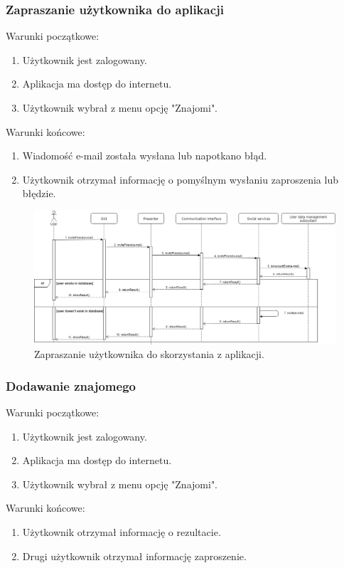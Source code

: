 \documentclass[10pt,twoside,a4paper]{report}
\begin{document}
\subsubsection{Zapraszanie użytkownika do aplikacji}

\noindent Warunki początkowe:
\begin{enumerate}
  \item Użytkownik jest zalogowany.
  \item Aplikacja ma dostęp do internetu.
  \item Użytkownik wybrał z menu opcję "Znajomi".
\end{enumerate}
\par
\noindent\newline
Warunki końcowe:
\begin{enumerate}
  \item Wiadomość e-mail została wysłana lub napotkano błąd.
  \item Użytkownik otrzymał informację o pomyślnym wysłaniu zaproszenia lub błędzie.
\end{enumerate}

\noindent\newline
\begin{figure}[h]
\centering
\includegraphics[width=\linewidth]{inviteFriend}
\caption{Zapraszanie użytkownika do skorzystania z aplikacji.}
\label{fig:inviteFriend}
\end{figure}
\FloatBarrier
\subsubsection{Dodawanie znajomego}

\noindent Warunki początkowe:
\begin{enumerate}
  \item Użytkownik jest zalogowany.
  \item Aplikacja ma dostęp do internetu.
  \item Użytkownik wybrał z menu opcję "Znajomi".
\end{enumerate}
\par
\noindent\newline
Warunki końcowe:
\begin{enumerate}
  \item Użytkownik otrzymał informację o rezultacie.
  \item Drugi użytkownik otrzymał informację zaproszenie.
\end{enumerate}
\end{document}
